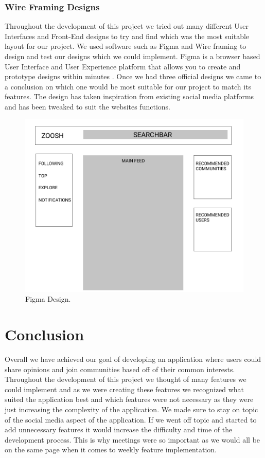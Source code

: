 \newline

\subsection{Wire Framing Designs}

Throughout the development of this project we tried out many different User Interfaces and Front-End designs to try and find which was the most suitable layout for our project. We used software such as Figma and Wire framing to design and test our designs which we could implement. Figma is a browser based User Interface and User Experience platform that allows you to create and prototype designs within minutes \cite{figma}. Once we had three official designs we came to a conclusion on which one would be most suitable for our project to match its features. The design has taken inspiration from existing social media platforms and has been tweaked to suit the websites functions. 

\begin{figure}[H]
  \centering
  \includegraphics[scale=0.4]{img/FIGMA.PNG}
  \caption{Figma Design.}
  \label{fig:Final Figma design.}
\end{figure}

\chapter{Conclusion}
Overall we have achieved our goal of developing an application where users could share opinions and join communities based off of their common interests. Throughout the development of this project we thought of many features we could implement and as we were creating these features we recognized what suited the application best and which features were not necessary as they were just increasing the complexity of the application. We made sure to stay on topic of the social media aspect of the application. If we went off topic and started to add unnecessary features it would increase the difficulty and time of the development process. This is why meetings were so important as we would all be on the same page when it comes to weekly feature implementation. 

